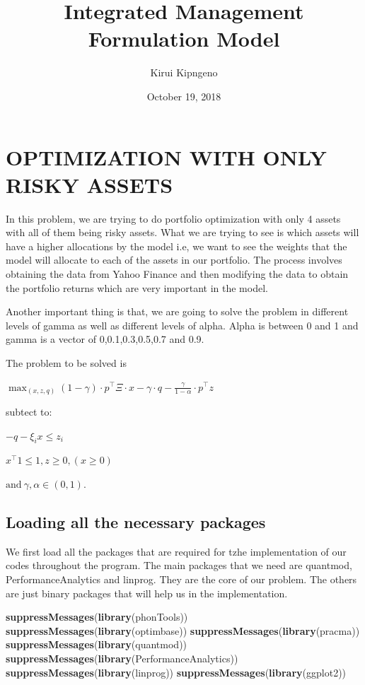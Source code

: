 \documentclass[]{article}
\title{Integrated Management Formulation Model}
\author{Kirui Kipngeno}
\date{October 19, 2018}
\newenvironment{Shaded}{\begin{snugshade}}{\end{snugshade}}
\newcommand{\KeywordTok}[1]{\textcolor[rgb]{0.13,0.29,0.53}{\textbf{#1}}}
\newcommand{\NormalTok}[1]{#1}
\begin{document}
\maketitle

\section{OPTIMIZATION WITH ONLY RISKY
ASSETS}\label{optimization-with-only-risky-assets}

In this problem, we are trying to do portfolio optimization with only 4
assets with all of them being risky assets. What we are trying to see is
which assets will have a higher allocations by the model i.e, we want to
see the weights that the model will allocate to each of the assets in
our portfolio. The process involves obtaining the data from Yahoo
Finance and then modifying the data to obtain the portfolio returns
which are very important in the model.

Another important thing is that, we are going to solve the problem in
different levels of gamma as well as different levels of alpha. Alpha is
between 0 and 1 and gamma is a vector of 0,0.1,0.3,0.5,0.7 and 0.9.

The problem to be solved is

\(\max_{(x,z,q)} (1-\gamma) \cdot p^\top \Xi \cdot x - \gamma \cdot q- \frac{\gamma}{1-\alpha} \cdot p^\top z\)

subtect to:

\(-q-\xi_i x \leq z_i\)

\(x^\top 1 \leq 1 ,z \geq 0 , (x\geq 0)\)

\(\text{and}\  \gamma,\alpha \in (0,1)\).

\subsection{Loading all the necessary
packages}\label{loading-all-the-necessary-packages}

We first load all the packages that are required for tzhe implementation
of our codes throughout the program. The main packages that we need are
quantmod, PerformanceAnalytics and linprog. They are the core of our
problem. The others are just binary packages that will help us in the
implementation.

\begin{Shaded}
\begin{Highlighting}[]
\KeywordTok{suppressMessages}\NormalTok{(}\KeywordTok{library}\NormalTok{(phonTools))}
\KeywordTok{suppressMessages}\NormalTok{(}\KeywordTok{library}\NormalTok{(optimbase))}
\KeywordTok{suppressMessages}\NormalTok{(}\KeywordTok{library}\NormalTok{(pracma))}
\KeywordTok{suppressMessages}\NormalTok{(}\KeywordTok{library}\NormalTok{(quantmod))}
\KeywordTok{suppressMessages}\NormalTok{(}\KeywordTok{library}\NormalTok{(PerformanceAnalytics))}
\KeywordTok{suppressMessages}\NormalTok{(}\KeywordTok{library}\NormalTok{(linprog))}
\KeywordTok{suppressMessages}\NormalTok{(}\KeywordTok{library}\NormalTok{(ggplot2))}
\end{Highlighting}
\end{Shaded}
\end{document}
